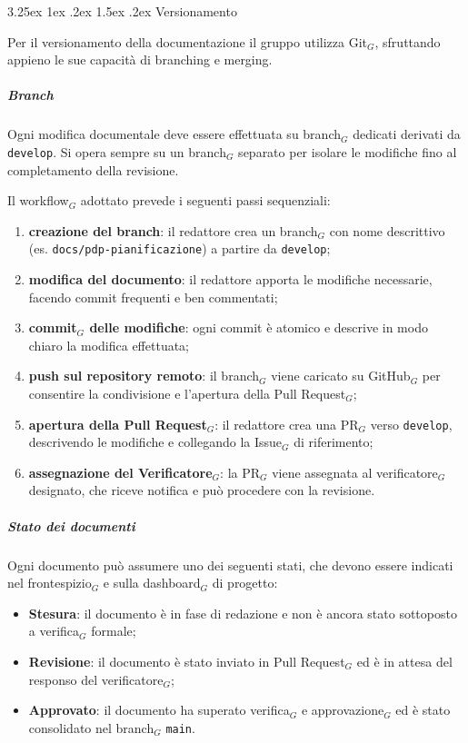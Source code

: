\documentclass[a4paper, 10pt]{article}
\makeatletter
\renewcommand\paragraph{\@startsection{paragraph}{4}{\z@}%
  {3.25ex \@plus1ex \@minus .2ex}%
  {1.5ex \@plus .2ex}%
  {\normalfont\normalsize\bfseries}}
\makeatother
\begin{document}
\paragraph{Versionamento}

Per il versionamento della documentazione il gruppo utilizza Git$_G$, sfruttando appieno le sue capacità di branching e merging.

\subparagraph{Branch}

Ogni modifica documentale deve essere effettuata su branch$_G$ dedicati derivati da \texttt{develop}. Si opera sempre su un branch$_G$ separato per isolare le modifiche fino al completamento della revisione.

Il workflow$_G$ adottato prevede i seguenti passi sequenziali:
\begin{enumerate}
    \item \textbf{creazione del branch}: il redattore crea un branch$_G$ con nome descrittivo (es. \texttt{docs/pdp-pianificazione}) a partire da \texttt{develop};
    \item \textbf{modifica del documento}: il redattore apporta le modifiche necessarie, facendo commit frequenti e ben commentati;
    \item \textbf{commit$_G$ delle modifiche}: ogni commit è atomico e descrive in modo chiaro la modifica effettuata;
    \item \textbf{push sul repository remoto}: il branch$_G$ viene caricato su GitHub$_G$ per consentire la condivisione e l'apertura della Pull Request$_G$;
    \item \textbf{apertura della Pull Request$_G$}: il redattore crea una PR$_G$ verso \texttt{develop}, descrivendo le modifiche e collegando la Issue$_G$ di riferimento;
    \item \textbf{assegnazione del Verificatore$_G$}: la PR$_G$ viene assegnata al verificatore$_G$ designato, che riceve notifica e può procedere con la revisione.
\end{enumerate}

\subparagraph{Stato dei documenti}

Ogni documento può assumere uno dei seguenti stati, che devono essere indicati nel frontespizio$_G$ e sulla dashboard$_G$ di progetto:
\begin{itemize}
    \item \textbf{Stesura}: il documento è in fase di redazione e non è ancora stato sottoposto a verifica$_G$ formale;
    \item \textbf{Revisione}: il documento è stato inviato in Pull Request$_G$ ed è in attesa del responso del verificatore$_G$;
    \item \textbf{Approvato}: il documento ha superato verifica$_G$ e approvazione$_G$ ed è stato consolidato nel branch$_G$ \texttt{main}.
\end{itemize}
\end{document}
